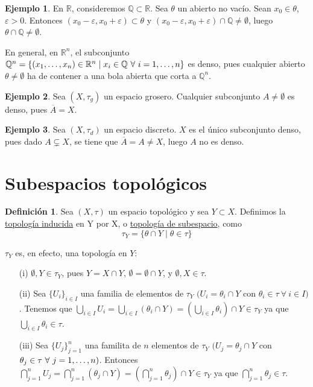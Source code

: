 \documentclass[12pt]{report}
\theoremstyle{definition}
\newtheorem{definition}{Definición}[chapter]
\theoremstyle{definition}
\newtheorem{example}{Ejemplo}[chapter]
\theoremstyle{remark}
\newcommand{\R}{\mathbb R}
\newcommand{\Q}{\mathbb Q}
\begin{document}
\begin{example}
En $\R$, consideremos $\Q \subset \R$. Sea $\theta$ un abierto no vacío. Sean $x_0 \in \theta$, $\varepsilon > 0$. Entonces $(x_0 - \varepsilon, x_0 + \varepsilon) \subset \theta$ y $(x_0 - \varepsilon, x_0 + \varepsilon) \cap \Q \neq \emptyset$, luego $\theta \cap \Q \neq \emptyset$.

\vspace{2mm}
En general, en $\R^n$, el subconjunto $\Q^n = \{(x_1,\mathellipsis,x_n) \in \R^n \mid x_i \in \Q \ \forall\ i = 1,\mathellipsis,n\}$ es denso, pues cualquier abierto $\theta \neq \emptyset$ ha de contener a una bola abierta que corta a $\Q^n$.
\end{example}

\begin{example}
Sea $(X,\tau_g)$ un espacio grosero. Cualquier subconjunto $A \neq \emptyset$ es denso, pues $\overline{A} = X$.
\end{example}

\begin{example}
Sea $(X,\tau_d)$ un espacio discreto. $X$ es el único subconjunto denso, pues dado $A \subsetneq X$, se tiene que $\overline{A} = A \neq X$, luego $A$ no es denso.
\end{example}

\section{Subespacios topológicos}

\begin{definition}
Sea $(X,\tau)$ un espacio topológico y sea $Y \subset X$. Definimos la \underline{topología inducida} en Y por X, o \underline{topología de subespacio}, como \[\tau_Y = \{\theta \cap Y \mid \theta \in \tau\}\]
\end{definition}

$\tau_Y$ es, en efecto, una topología en $Y$:
\begin{itemize}
    \item[(i)] $\emptyset, Y \in \tau_Y$, pues $Y = X \cap Y$, $\emptyset = \emptyset \cap Y$, y $\emptyset, X \in \tau$.
    \item[(ii)] Sea $\{U_i\}_{i \in I}$ una familia de elementos de $\tau_Y$ $(U_i = \theta_i \cap Y$ con $\theta_i \in \tau \ \forall \ i \in I)$. Tenemos que $\bigcup_{i \in I} U_i = \bigcup_{i \in I} (\theta_i \cap Y) = (\bigcup_{i \in I}\theta_i) \cap Y \in \tau_Y$ ya que $\bigcup_{i \in I}\theta_i \in \tau$.
    \item[(iii)] Sea $\{U_j\}_{j=1}^n$ una familita de $n$ elementos de $\tau_Y$ $(U_j = \theta_j \cap Y$ con $\theta_j \in \tau \ \forall \ j = 1,\mathellipsis,n)$. Entonces $\bigcap_{j=1}^n U_j = \bigcap_{j=1}^n (\theta_j \cap Y) = (\bigcap_{j=1}^n \theta_j) \cap Y \in \tau_Y$ ya que $\bigcap_{j=1}^n \theta_j \in \tau$.
\end{itemize}
\end{document}
